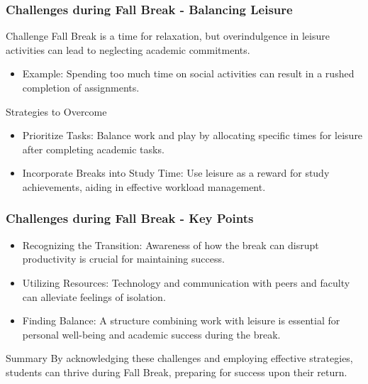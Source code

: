 \documentclass[aspectratio=169]{beamer}
\begin{document}
\begin{frame}[fragile]
    \frametitle{Challenges during Fall Break - Balancing Leisure}
    \begin{block}{Challenge}
        Fall Break is a time for relaxation, but overindulgence in leisure activities can lead to neglecting academic commitments.
        \begin{itemize}
            \item Example: Spending too much time on social activities can result in a rushed completion of assignments.
        \end{itemize}
    \end{block}
    
    \begin{block}{Strategies to Overcome}
        \begin{itemize}
            \item Prioritize Tasks: Balance work and play by allocating specific times for leisure after completing academic tasks.
            \item Incorporate Breaks into Study Time: Use leisure as a reward for study achievements, aiding in effective workload management.
        \end{itemize}
    \end{block}
\end{frame}

\begin{frame}[fragile]
    \frametitle{Challenges during Fall Break - Key Points}
    \begin{itemize}
        \item Recognizing the Transition: Awareness of how the break can disrupt productivity is crucial for maintaining success.
        \item Utilizing Resources: Technology and communication with peers and faculty can alleviate feelings of isolation.
        \item Finding Balance: A structure combining work with leisure is essential for personal well-being and academic success during the break.
    \end{itemize}
    
    \begin{block}{Summary}
        By acknowledging these challenges and employing effective strategies, students can thrive during Fall Break, preparing for success upon their return.
    \end{block}
\end{frame}
\end{document}
